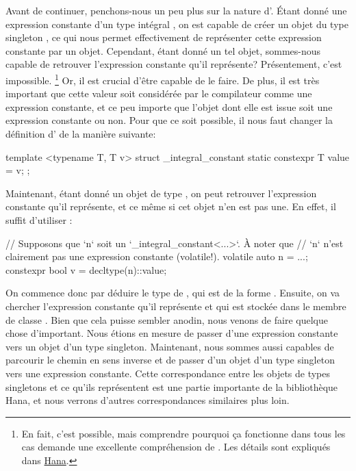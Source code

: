 Avant de continuer, penchons-nous un peu plus sur la nature d'.
Étant donné une expression constante  d'un type intégral , on est
capable de créer un objet du type singleton , ce qui
nous permet effectivement de représenter cette expression constante par un objet.
Cependant, étant donné un tel objet, sommes-nous capable de retrouver l'expression
constante qu'il représente? Présentement, c'est impossible.
\footnote{
    En fait, c'est possible, mais comprendre pourquoi ça fonctionne dans tous
    les cas demande une excellente compréhension de . Les
    détails sont expliqués dans \href{\Hana}{Hana}.
}
Or, il est crucial d'être capable de le faire. De plus, il est très important
que cette valeur soit considérée par le compilateur comme une expression constante,
et ce peu importe que l'objet dont elle est issue soit une expression constante ou
non. Pour que ce soit possible, il nous faut changer la définition
d' de la manière suivante:
\begin{cpp}
    template <typename T, T v>
    struct _integral_constant {
        static constexpr T value = v;
    };
\end{cpp}

Maintenant, étant donné un objet de type , on
peut retrouver l'expression constante qu'il représente, et ce même si cet objet
n'en est pas une. En effet, il suffit d'utiliser :
\begin{cpp}
    // Supposons que `n` soit un `_integral_constant<...>`. À noter que
    // `n` n'est clairement pas une expression constante (volatile!).
    volatile auto n = ...;
    constexpr bool v = decltype(n)::value;
\end{cpp}

On commence donc par déduire le type de , qui est de la forme
. Ensuite, on va chercher l'expression
constante qu'il représente et qui est stockée dans le membre de classe
. Bien que cela puisse sembler anodin, nous venons de faire
quelque chose d'important. Nous étions en mesure de passer d'une expression
constante vers un objet d'un type singleton. Maintenant, nous sommes aussi
capables de parcourir le chemin en sens inverse et de passer d'un objet d'un
type singleton vers une expression constante. Cette correspondance entre les
objets de types singletons et ce qu'ils représentent est une partie importante
de la bibliothèque Hana, et nous verrons d'autres correspondances similaires
plus loin.


